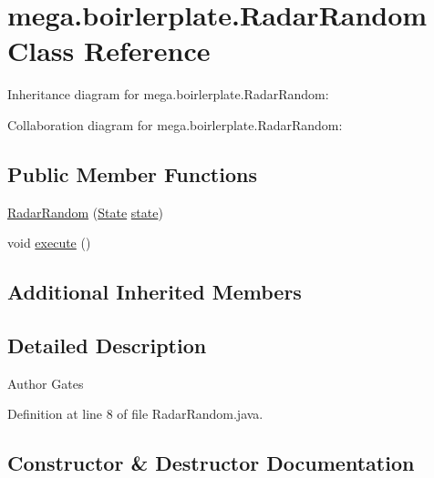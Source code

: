 \hypertarget{classmega_1_1boirlerplate_1_1_radar_random}{}\section{mega.\+boirlerplate.\+Radar\+Random Class Reference}
\label{classmega_1_1boirlerplate_1_1_radar_random}


Inheritance diagram for mega.\+boirlerplate.\+Radar\+Random\+:


Collaboration diagram for mega.\+boirlerplate.\+Radar\+Random\+:
\subsection*{Public Member Functions}
\begin{DoxyCompactItemize}
\item 
\hyperlink{classmega_1_1boirlerplate_1_1_radar_random_ab6674ba158aea7140d08cbf79e9037b6}{Radar\+Random} (\hyperlink{classmega_1_1boirlerplate_1_1_state}{State} \hyperlink{classmega_1_1boirlerplate_1_1_component_a87b0d70f323b5fee60a200e07c9c20fd}{state})
\item 
void \hyperlink{classmega_1_1boirlerplate_1_1_radar_random_ab0ae150efd7520d39df919a9a2837c65}{execute} ()
\end{DoxyCompactItemize}
\subsection*{Additional Inherited Members}


\subsection{Detailed Description}
\begin{DoxyAuthor}{Author}
Gates 
\end{DoxyAuthor}


Definition at line 8 of file Radar\+Random.\+java.



\subsection{Constructor \& Destructor Documentation}
\mbox{\label{classmega_1_1boirlerplate_1_1_radar_random_ab6674ba158aea7140d08cbf79e9037b6}} 
